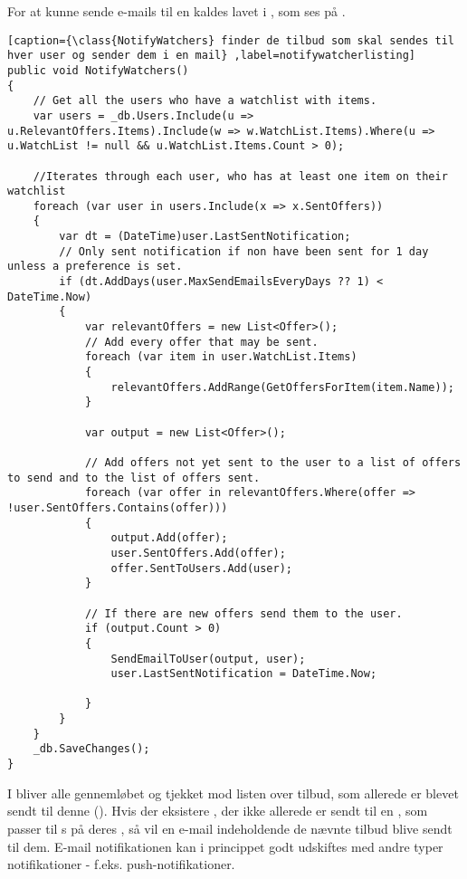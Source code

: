 For at kunne sende e-mails til en \class[User] kaldes  lavet i , som ses på . 
\begin{lstlisting}[caption={\class{NotifyWatchers} finder de tilbud som skal sendes til hver user og sender dem i en mail} ,label=notifywatcherlisting]
public void NotifyWatchers()
{
    // Get all the users who have a watchlist with items.
    var users = _db.Users.Include(u => u.RelevantOffers.Items).Include(w => w.WatchList.Items).Where(u => u.WatchList != null && u.WatchList.Items.Count > 0);

	//Iterates through each user, who has at least one item on their watchlist
    foreach (var user in users.Include(x => x.SentOffers))
    {
        var dt = (DateTime)user.LastSentNotification;
        // Only sent notification if non have been sent for 1 day unless a preference is set.
        if (dt.AddDays(user.MaxSendEmailsEveryDays ?? 1) < DateTime.Now)
        {
            var relevantOffers = new List<Offer>();
            // Add every offer that may be sent. 
            foreach (var item in user.WatchList.Items)
            {
                relevantOffers.AddRange(GetOffersForItem(item.Name));
            }

            var output = new List<Offer>();

            // Add offers not yet sent to the user to a list of offers to send and to the list of offers sent.
            foreach (var offer in relevantOffers.Where(offer => !user.SentOffers.Contains(offer)))
            {
                output.Add(offer);
                user.SentOffers.Add(offer);
                offer.SentToUsers.Add(user);
            }

            // If there are new offers send them to the user.
            if (output.Count > 0)
            {
                SendEmailToUser(output, user);
                user.LastSentNotification = DateTime.Now;

            }
        }
    }
    _db.SaveChanges();
}
\end{lstlisting}
I  bliver alle   gennemløbet og tjekket mod listen over tilbud, som allerede er blevet sendt til denne  (). 
Hvis der eksistere , der ikke allerede er sendt til en , som passer til s på deres , så vil en e-mail indeholdende de nævnte tilbud blive sendt til dem. 
E-mail notifikationen kan i princippet godt udskiftes med andre typer notifikationer - f.eks. push-notifikationer. 

